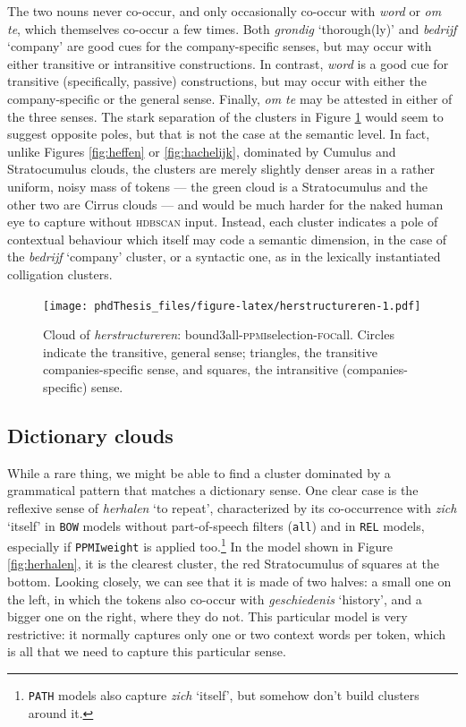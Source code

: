 \documentclass[
]{book}
\begin{document}
The two nouns never co-occur, and only occasionally co-occur with \emph{word} or \emph{om te}, which themselves co-occur a few times. Both \emph{grondig} `thorough(ly)' and \emph{bedrijf} `company' are good cues for the company-specific senses, but may occur with either transitive or intransitive constructions. In contrast, \emph{word} is a good cue for transitive (specifically, passive) constructions, but may occur with either the company-specific or the general sense. Finally, \emph{om te} may be attested in either of the three senses. The stark separation of the clusters in Figure \ref{fig:herstructureren} would seem to suggest opposite poles, but that is not the case at the semantic level. In fact, unlike Figures \ref{fig:heffen} or \ref{fig:hachelijk}, dominated by Cumulus and Stratocumulus clouds, the clusters are merely slightly denser areas in a rather uniform, noisy mass of tokens --- the green cloud is a Stratocumulus and the other two are Cirrus clouds --- and would be much harder for the naked human eye to capture without \textsc{hdbscan} input. Instead, each cluster indicates a pole of contextual behaviour which itself may code a semantic dimension, in the case of the \emph{bedrijf} `company' cluster, or a syntactic one, as in the lexically instantiated colligation clusters.



\begin{figure}
\centering
\texttt{[image: phdThesis\_files/figure-latex/herstructureren-1.pdf]}
\caption{\label{fig:herstructureren}Cloud of \emph{herstructureren}: bound3all-\textsc{ppmi}selection-\textsc{foc}all. Circles indicate the transitive, general sense; triangles, the transitive companies-specific sense, and squares, the intransitive (companies-specific) sense.}
\end{figure}

\hypertarget{dictionary-clouds}{%
\subsection{Dictionary clouds}\label{dictionary-clouds}}

While a rare thing, we might be able to find a cluster dominated by a grammatical pattern that matches a dictionary sense. One clear case is the reflexive sense of \emph{herhalen} `to repeat', characterized by its co-occurrence with \emph{zich} `itself' in \texttt{BOW} models without part-of-speech filters (\texttt{all}) and in \texttt{REL} models, especially if \texttt{PPMIweight} is applied too.\footnote{\texttt{PATH} models also capture \emph{zich} `itself', but somehow don't build clusters around it.}
In the model shown in Figure \ref{fig:herhalen}, it is the clearest cluster, the red Stratocumulus of squares at the bottom. Looking closely, we can see that it is made of two halves: a small one on the left, in which the tokens also co-occur with \emph{geschiedenis} `history', and a bigger one on the right, where they do not. This particular model is very restrictive: it normally captures only one or two context words per token, which is all that we need to capture this particular sense.
\end{document}
